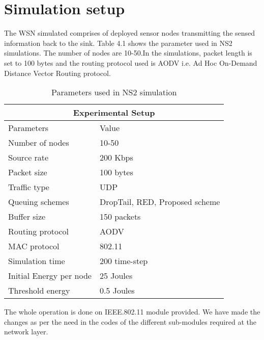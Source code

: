  \section{Simulation setup}
 The WSN simulated comprises of deployed sensor nodes transmitting the sensed information back to the sink. Table 4.1 shows the parameter used in NS2 simulations. The number of nodes are 10-50.In the simulations, packet length is set to 100 bytes and the routing protocol used is AODV i.e. Ad Hoc On-Demand Distance Vector Routing protocol.  
\begin{table}[h!]
\begin{center}
\caption{Parameters used in NS2 simulation}
\begin{tabular}{ |p{3.2cm}|p{3.5cm}|  }
\hline
\multicolumn{2}{|c|}{Experimental Setup} \\
\hline
Parameters & Value  \\
\hline
Number of nodes & 10-50   \\
Source rate &  200 Kbps  \\
Packet size &  100 bytes \\
Traffic type & UDP \\
Queuing schemes &  DropTail, RED, Proposed scheme\\
Buffer size & 150 packets\\
Routing protocol &  AODV\\
MAC protocol &  802.11  \\
Simulation time  & 200 time-step  \\
Initial Energy per node & 25 Joules \\
Threshold energy & 0.5 Joules\\
\hline
\end{tabular}
\end{center}
\end{table}
 The whole operation is done on IEEE.802.11 module provided. We have made the changes as per the need in the codes of the different sub-modules required at the network layer. 
